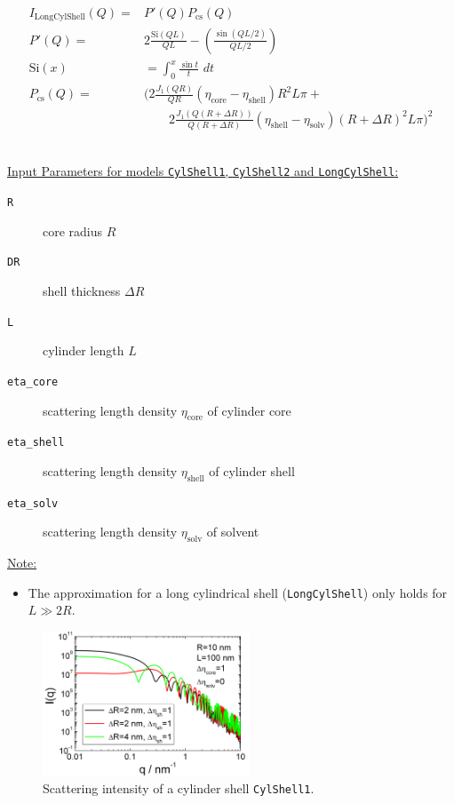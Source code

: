 \begin{align}
  I_\text{LongCylShell}(Q) = & P'(Q) P_\text{cs}(Q) \\
  P'(Q)  = & 2 \frac{\text{Si}(Q L)}{QL} - \left(\frac{\sin(QL/2)}{QL/2}\right) \\
  \text{Si}(x) & = \int_0^x\!\frac{\sin t}{t}\,\,dt \\
  P_\text{cs}(Q)  =  & \biggl(
            2\frac{J_1(QR)}{QR}
            \left(\eta_\text{core}-\eta_\text{shell}\right)R^2L\pi + \\
         & \qquad
            2\frac{J_1(Q(R+\Delta R))}{Q(R+\Delta R)}
            \left(\eta_\text{shell}-\eta_\text{solv}\right)(R+\Delta R)^2L\pi
      \biggr)^2  \nonumber
\end{align}


\vspace{5mm}

\hspace{1pt}\\
\underline{Input Parameters for models \texttt{CylShell1}, \texttt{CylShell2} and \texttt{LongCylShell}:}\\
\begin{description}
\item[\texttt{R}] core radius $R$
\item[\texttt{DR}] shell thickness $\Delta R$
\item[\texttt{L}] cylinder length $L$
\item[\texttt{eta\_core}] scattering length density $\eta_\text{core}$ of cylinder core
\item[\texttt{eta\_shell}] scattering length density $\eta_\text{shell}$ of cylinder shell
\item[\texttt{eta\_solv}] scattering length density $\eta_\text{solv}$ of solvent
\end{description}

\underline{Note:}
\begin{itemize}
\item The approximation for a long cylindrical shell (\texttt{LongCylShell}) only holds for $L \gg 2R$.
\end{itemize}

\begin{figure}[htb]
\begin{center}
\includegraphics[width=0.55\textwidth,height=0.4\textwidth]{../images/form_factor/cylindrical_obj/CylShell1IQ.png}
\end{center}
\caption{Scattering intensity of a cylinder shell \texttt{CylShell1}.}
\label{fig:CylShell1}
\end{figure}

